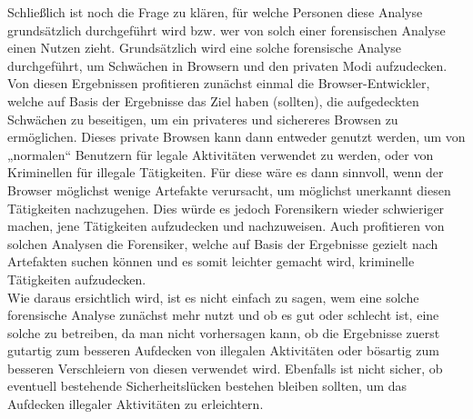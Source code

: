 \thispagestyle{plain.scrheadings}
\ohead{}
Schließlich ist noch die Frage zu klären, für welche Personen diese Analyse grundsätzlich durchgeführt wird bzw. wer von solch einer forensischen Analyse einen Nutzen zieht. Grundsätzlich wird eine solche forensische Analyse durchgeführt, um Schwächen in Browsern und den privaten Modi aufzudecken. Von diesen Ergebnissen profitieren zunächst einmal die Browser-Entwickler, welche auf Basis der Ergebnisse das Ziel haben (sollten), die aufgedeckten Schwächen zu beseitigen, um ein privateres und sichereres Browsen zu ermöglichen. Dieses private Browsen kann dann entweder genutzt werden, um von „normalen“ Benutzern für legale Aktivitäten verwendet zu werden, oder von Kriminellen für illegale Tätigkeiten. Für diese wäre es dann sinnvoll, wenn der Browser möglichst wenige Artefakte verursacht, um möglichst unerkannt diesen Tätigkeiten nachzugehen. Dies würde es jedoch Forensikern wieder schwieriger machen, jene Tätigkeiten aufzudecken und nachzuweisen. Auch profitieren von solchen Analysen die Forensiker, welche auf Basis der Ergebnisse gezielt nach Artefakten suchen können und es somit leichter gemacht wird, kriminelle Tätigkeiten aufzudecken. \\
Wie daraus ersichtlich wird, ist es nicht einfach zu sagen, wem eine solche forensische Analyse zunächst mehr nutzt und ob es gut oder schlecht ist, eine solche zu betreiben, da man nicht vorhersagen kann, ob die Ergebnisse zuerst gutartig zum besseren Aufdecken von illegalen Aktivitäten oder bösartig zum besseren Verschleiern von diesen verwendet wird. Ebenfalls ist nicht sicher, ob eventuell bestehende Sicherheitslücken bestehen bleiben sollten, um das Aufdecken illegaler Aktivitäten zu erleichtern.

